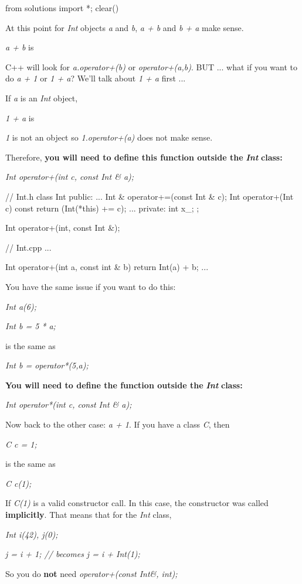 \begin{python0}
from solutions import *; clear()
\end{python0}

At this point for \textit{Int} objects \textit{a} and \textit{b}, \textit{a + b}
and \textit{b + a} make sense.

\textit{a + b} is

C++ will look for \textit{a.operator+(b)} or \textit{operator+(a,b)}. BUT
... what if you want to do \textit{a + 1} or \textit{1 + a}? We'll talk
about \textit{1 + a} first ...

If \textit{a} is an \textit{Int} object,

\textit{1 + a} is

\textit{1} is not an object so \textit{1.operator+(a)} does not make sense.

Therefore, \textbf{you will need to define this function outside the
}\textit{\textbf{Int}}\textbf{ class:}

\textit{Int operator+(int c, const Int \& a);}

\begin{consolethree}[escapeinside=||]
// Int.h
class Int
{
public:
    ...
    Int & operator+=(const Int & c);
    Int operator+(Int c) const
    {
        return (Int(*this) += c);
    }
    ...
private:
    int x_;
};

Int operator+(int, const Int &);
\end{consolethree}

\begin{consolethree}[escapeinside=||]
// Int.cpp
...

Int operator+(int a, const int & b)
{
    return Int(a) + b;
}
...
\end{consolethree}

You have the same issue if you want to do this:

\textit{Int a(6);}

\textit{Int b = 5 * a;}

is the same as

\textit{Int b = operator*(5,a);}

\textbf{You will need to define the function outside the
}\textit{\textbf{Int}}\textbf{ class:}

\textit{Int operator*(int c, const Int \& a);}

Now back to the other case: \textit{a + 1}. If you have a class \textit{C},
then

\textit{C c = 1;}

is the same as

\textit{C c(1);}

If \textit{C(1)} is a valid constructor call. In this case, the
constructor was called \textbf{implicitly}. That means that for the
\textit{Int} class,

\textit{Int i(42), j(0);}

\textit{j = i + 1; // becomes j = i + Int(1);}

So you do \textbf{not} need \textit{operator+(const Int\&, int);}



